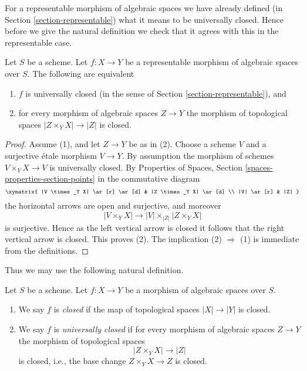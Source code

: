 \noindent
For a representable morphism of algebraic spaces we have already defined (in
Section \ref{section-representable})
what it means to be universally closed. Hence before we give the natural
definition we check that it agrees with this in the representable case.

\begin{lemma}
\label{lemma-characterize-representable-universally-closed}
Let $S$ be a scheme. Let $f : X \to Y$ be a representable morphism of
algebraic spaces over $S$. The following are equivalent
\begin{enumerate}
\item $f$ is universally closed
(in the sense of Section \ref{section-representable}), and
\item for every morphism of algebraic spaces $Z \to Y$ the morphism of
topological spaces $|Z \times_Y X| \to |Z|$ is closed.
\end{enumerate}
\end{lemma}

\begin{proof}
Assume (1), and let $Z \to Y$ be as in (2). Choose a scheme $V$ and
a surjective \'etale morphism $V \to Y$. By assumption the morphism
of schemes $V \times_Y X \to V$ is universally closed. By
Properties of Spaces, Section \ref{spaces-properties-section-points}
in the commutative diagram
$$
\xymatrix{
|V \times_Y X| \ar[r] \ar[d] & |Z \times_Y X| \ar[d] \\
|V| \ar[r] & |Z|
}
$$
the horizontal arrows are open and surjective, and moreover
$$
|V \times_Y X| \longrightarrow |V| \times_{|Z|} |Z \times_Y X|
$$
is surjective. Hence as the left
vertical arrow is closed it follows that the right vertical arrow is
closed. This proves (2). The implication (2) $\Rightarrow$ (1) is
immediate from the definitions.
\end{proof}

\noindent
Thus we may use the following natural definition.

\begin{definition}
\label{definition-closed}
Let $S$ be a scheme. Let $f : X \to Y$ be a morphism of algebraic spaces
over $S$.
\begin{enumerate}
\item We say $f$ is {\it closed} if the map of topological
spaces $|X| \to |Y|$ is closed.
\item We say $f$ is {\it universally closed} if for every morphism
of algebraic spaces $Z \to Y$ the morphism of topological spaces
$$
|Z \times_Y X| \to |Z|
$$
is closed, i.e., the base change $Z \times_Y X \to Z$ is closed.
\end{enumerate}
\end{definition}

